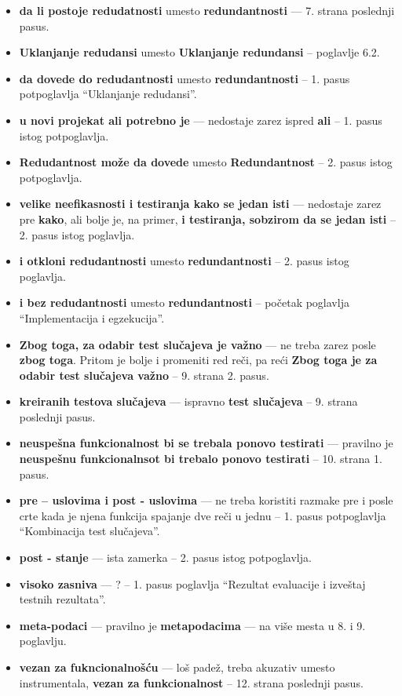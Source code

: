 \documentclass[a4paper]{report}
\begin{document}
\begin{itemize}
\item {\bf{da li postoje redudatnosti}} umesto {\bf{redundantnosti}} --- 7. strana poslednji pasus.
\item {\bf{Uklanjanje redudansi}} umesto {\bf{Uklanjanje redundansi}} -- poglavlje 6.2.
\item {\bf{da dovede do redudantnosti}} umesto {\bf{redundantnosti}} -- 1. pasus potpoglavlja ``Uklanjanje redudansi''.
\item {\bf{u novi projekat ali potrebno je}} --- nedostaje zarez ispred {\bf{ali}} -- 1. pasus istog potpoglavlja.
\item {\bf{Redudantnost može da dovede}} umesto {\bf{Redundantnost}} -- 2. pasus istog potpoglavlja.
\item {\bf{velike neefikasnosti i testiranja kako se jedan isti}} --- nedostaje zarez pre {\bf{kako}}, ali bolje je, na primer, {\bf{i testiranja, sobzirom da se jedan isti}} -- 2. pasus istog poglavlja.
\item {\bf{i otkloni redudantnosti}} umesto {\bf{redundantnosti}} -- 2. pasus istog poglavlja.
\item {\bf{i bez redudantnosti}} umesto {\bf{redundantnosti}}  -- početak poglavlja ``Implementacija i egzekucija''.
\item {\bf{Zbog toga, za odabir test slučajeva je važno}} --- ne treba zarez posle {\bf{zbog toga}}. Pritom je bolje i promeniti red reči, pa reći {\bf{Zbog toga je za odabir test slučajeva važno}} -- 9. strana 2. pasus.
\item {\bf{kreiranih testova slučajeva}} --- ispravno {\bf{test slučajeva}} -- 9. strana poslednji pasus.
\item {\bf{neuspešna funkcionalnost bi se trebala ponovo testirati}} --- pravilno je {\bf{neuspešnu funkcionalnsot bi trebalo ponovo testirati}} -- 10. strana 1. pasus.
\item {\bf{ pre – uslovima i post - uslovima}} --- ne treba koristiti razmake pre i posle crte kada je njena funkcija spajanje dve reči u jednu -- 1. pasus potpoglavlja ``Kombinacija test slučajeva''.
\item {\bf{post - stanje}} --- ista zamerka -- 2. pasus istog potpoglavlja.
\item {\bf{visoko zasniva}} --- ? -- 1. pasus poglavlja ``Rezultat evaluacije i izveštaj testnih rezultata''.
\item {\bf{meta-podaci}} --- pravilno je {\bf{metapodacima}} --- na više mesta u 8. i 9. poglavlju.
\item {\bf{vezan za fukncionalnošću}} --- loš padež, treba akuzativ umesto instrumentala, {\bf{vezan za funkcionalnost}} -- 12. strana poslednji pasus.

\end{itemize}
\end{document}
